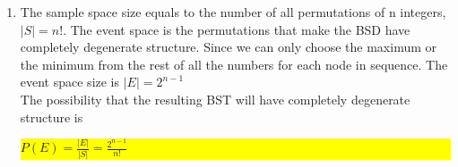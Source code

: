 \documentclass{article}
\begin{document}
\begin{enumerate}
\begin{enumerate}
		\item
		\mysolu
		The sample space size equals to the number of all permutations of n integers, ${|S|=n!}$. The event space is the permutations that make the BSD have completely degenerate structure. Since we can only choose the maximum or the minimum from the rest of all the numbers for each node in sequence. The event space size is ${|E|=2^{n-1}}$\\
		\myansw
		The possibility that the resulting BST will have completely degenerate structure is\\
		\colorbox{yellow}{
			${P(E)=\frac{|E|}{|S|}=\frac{2^{n-1}}{n!}}$
			
		}\\
		
		
	\end{enumerate}

	
	


\end{enumerate}

\newpage
\end{document}
